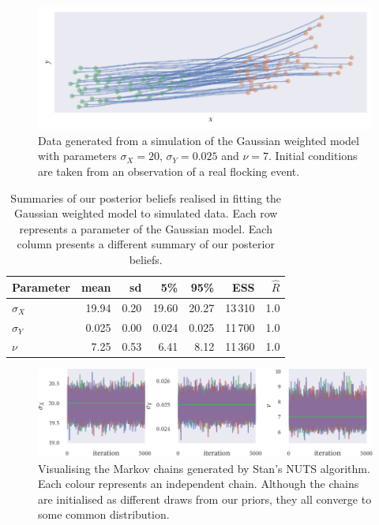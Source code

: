 \begin{figure}[tbp]
  \includegraphics{gauss_sim.pdf}
  \caption{Data generated from a simulation of the Gaussian weighted model with
    parameters $\sigma_X=20$, $\sigma_Y=0.025$ and $\nu=7$. Initial conditions are taken
    from an observation of a real flocking event.}
  \label{fig:gauss_sim_study}
\end{figure}
\begin{table}[tbp]
  \begin{tabular}{@{}lrrrrrr@{}}
    \toprule
    Parameter    & mean  & sd   & 5\%   & 95\%  & ESS     & $\widehat{R}$ \\
    \midrule
    $\sigma_{X}$ & 19.94 & 0.20 & 19.60 & 20.27 & 13\,310 & 1.0           \\
    $\sigma_{Y}$ & 0.025 & 0.00 & 0.024 & 0.025 & 11\,700 & 1.0           \\
    $\nu$        & 7.25  & 0.53 & 6.41  & 8.12  & 11\,360 & 1.0           \\
    \bottomrule
  \end{tabular}
  \caption{Summaries of our posterior beliefs realised in fitting the Gaussian weighted
    model to simulated data. Each row represents a parameter of the Gaussian model. Each
    column presents a different summary of our posterior beliefs.}
  \label{tab:gauss_sim_study_summary}
\end{table}
\begin{figure}[tbp]
  \includegraphics{gauss_trace.pdf}
  \caption{Visualising the Markov chains generated by Stan's NUTS algorithm. Each colour
    represents an independent chain. Although the chains are initialised as different draws
    from our priors, they all converge to some common distribution.}
  \label{fig:gauss_sim_study_chains}
\end{figure}
